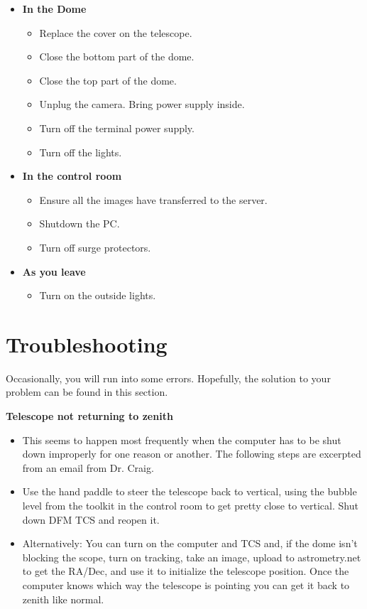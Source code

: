 \documentclass[letterpaper, 12pt]{report}
\begin{document}
\begin{itemize}
	\item {\large \textbf{In the Dome}}
	\begin{itemize}
		\item Replace the cover on the telescope.
		\item Close the bottom part of the dome.
		\item Close the top part of the dome.
		\item Unplug the camera. Bring power supply inside.
		\item Turn off the terminal power supply.
		\item Turn off the lights.
	\end{itemize}

	\item {\large \textbf{In the control room}}
	\begin{itemize}
		\item Ensure all the images have transferred to the server.
		\item Shutdown the PC.
		\item Turn off surge protectors.
	\end{itemize}

\item {\large \textbf{As you leave}}
\begin{itemize}
	\item Turn on the outside lights.
\end{itemize}
\end{itemize}
\newpage
\chapter{Troubleshooting}
Occasionally, you will run into some errors. Hopefully, the solution to your problem can be found in this section.

\noindent\textbf{Telescope not returning to zenith}
\begin{itemize}
	\item This seems to happen most frequently when the computer has to be shut down improperly for one reason or another. The following steps are excerpted from an email from Dr. Craig.
	\item Use the hand paddle to steer the telescope back to vertical, using the bubble level from the toolkit in the control room to get pretty close to vertical. Shut down DFM TCS and reopen it.
	\item Alternatively: You can turn on the computer and TCS and, if the dome isn’t blocking the scope, turn on tracking, take an image, upload to astrometry.net to get the RA/Dec, and use it to initialize the telescope position. Once the computer knows which way the telescope is pointing you can get it back to zenith like normal.
\end{itemize}
\end{document}
